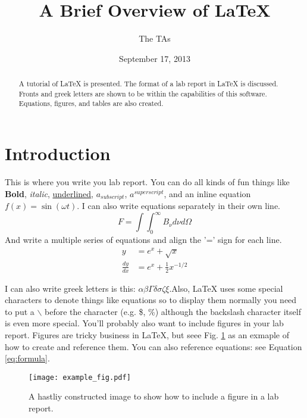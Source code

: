 \documentclass{article}
\begin{document}
\title{A Brief Overview of \LaTeX{}}
\author{The TAs}
\date{September 17, 2013}
\maketitle

\begin{abstract}
A tutorial of \LaTeX{} is presented. The format of a lab report in \LaTeX{} is discussed. Fronts and greek letters are shown to be within the capabilities of this software. Equations, figures, and tables are also created. 
\end{abstract}


\section{Introduction}
This is where you write you lab report. You can do all kinds of fun things like {\bf Bold}, {\it italic}, \underline{underlined}, $a_{subscript}$, $a^{superscript}$, and an inline equation $f(x) = \sin(\omega t)$. I can also write equations separately in their own line.
\begin{equation} \label{eq:formula}
F = \int \int_0^\infty B_\nu d\nu d\Omega
\end{equation}
And write a multiple series of equations and align the '=' sign for each line.
\begin{align}
y &= e^x + \sqrt{x} \\
\frac{dy}{dx} &= e^x + \frac{1}{2}x^{-1/2} 
\end{align}

I can also write greek letters is this: $\alpha\beta\Gamma\delta\sigma\zeta\xi$.Also, \LaTeX{} uses some special characters to denote things like equations so to display them normally you need to put a $\backslash$ before the character (e.g. \$, \%) although the backslash character itself is even more special. You'll probably also want to include figures in your lab report. Figures are tricky business in \LaTeX{}, but seee Fig. \ref{fig:example} as an exmaple of how to create and reference them. You can also reference equations: see Equation \ref{eq:formula}.  

\begin{figure}[!h]
\center
\texttt{[image: example\_fig.pdf]}
\caption {A hastliy constructed image to show how to include a figure in a lab report.} %
\label{fig:example}
\end{figure}
\end{document}
